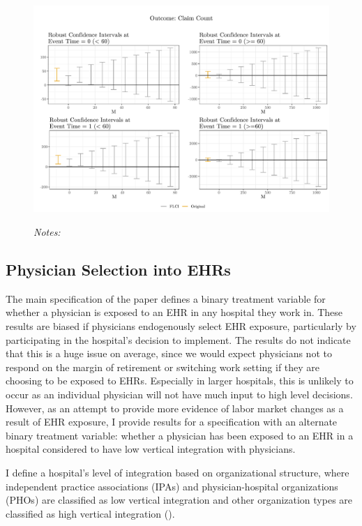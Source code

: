 \documentclass[12pt]{article}
\begin{document}
\begin{figure}[ht]
    \centering
    \captionsetup{width=.5\linewidth}
    \caption{}
    \includegraphics[scale=.5]{Objects/claim_pretrends_plot.pdf}
    \label{fig:pre_claim}
    \vspace{2mm}
    \caption*{\footnotesize{\textit{Notes:}}}
\end{figure}



\subsection{Physician Selection into EHRs}\label{sec:endog}

The main specification of the paper defines a binary treatment variable for whether a physician is exposed to an EHR in any hospital they work in. These results are biased if physicians endogenously select EHR exposure, particularly by participating in the hospital's decision to implement. The results do not indicate that this is a huge issue on average, since we would expect physicians not to respond on the margin of retirement or switching work setting if they are choosing to be exposed to EHRs. Especially in larger hospitals, this is unlikely to occur as an individual physician will not have much input to high level decisions. However, as an attempt to provide more evidence of labor market changes as a result of EHR exposure, I provide results for a specification with an alternate binary treatment variable: whether a physician has been exposed to an EHR in a hospital considered to have low vertical integration with physicians. 

I define a hospital's level of integration based on organizational structure, where independent practice associations (IPAs) and physician-hospital organizations (PHOs) are classified as low vertical integration and other organization types are classified as high vertical integration (\cite{dynan1998assessing}). 
\end{document}
